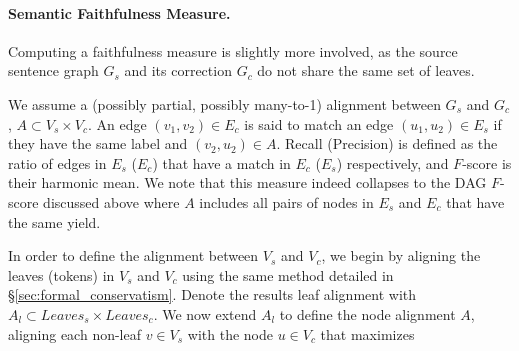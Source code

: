 \documentclass[letterpaper, 11pt]{article}
\begin{document}
\paragraph{Semantic Faithfulness Measure.} Computing a faithfulness
measure is slightly more involved, as the source sentence graph $G_s$ and its
correction $G_c$ do not share the same set of leaves.

%
%
We assume a (possibly partial, possibly many-to-1) alignment between $G_s$ and $G_c$,
$A \subset V_s \times V_c$. An edge $(v_1,v_2) \in E_c$ is said to match an edge
$(u_1,u_2) \in E_s$ if they have the same label and $(v_2,u_2) \in A$. Recall (Precision)
is defined as the ratio of edges in $E_s$ ($E_c$) that have a match in $E_c$ ($E_s$) respectively, and
$F$-score is their harmonic mean. We note that this measure indeed collapses to the
DAG $F$-score discussed above where $A$ includes all pairs of nodes in $E_s$ and $E_c$ that have
the same yield.

In order to define the alignment between $V_s$ and $V_c$, we begin by aligning the leaves
(tokens) in $V_s$ and $V_c$ using the same method detailed in \S \ref{sec:formal_conservatism}.
Denote the results leaf alignment with $A_l \subset Leaves_s \times Leaves_c$.
We now extend $A_l$ to define the node alignment $A$, aligning each non-leaf $v \in V_s$
with the node $u \in V_c$ that maximizes
\end{document}
